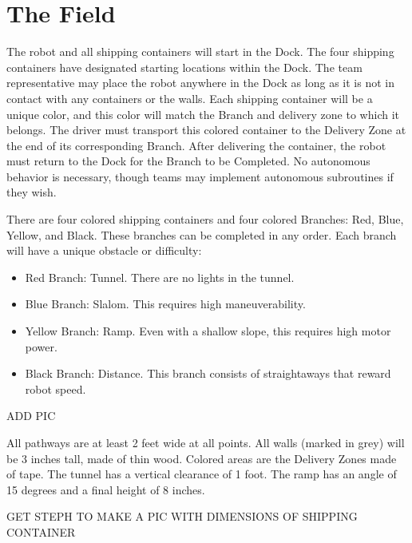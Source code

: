 \section{The Field}

The robot and all shipping containers will start in the Dock. The four shipping containers have designated starting locations within the Dock. The team representative may place the robot anywhere in the Dock as long as it is not in contact with any containers or the walls. Each shipping container will be a unique color, and this color will match the Branch and delivery zone to which it belongs. The driver must transport this colored container to the Delivery Zone at the end of its corresponding Branch. After delivering the container, the robot must return to the Dock for the Branch to be Completed. No autonomous behavior is necessary, though teams may implement autonomous subroutines if they wish. \newline 

\noindent
There are four colored shipping containers and four colored Branches: Red, Blue, Yellow, and Black. These branches can be completed in any order. Each branch will have a unique obstacle or difficulty:  

\begin{itemize}
    \item Red Branch: Tunnel. There are no lights in the tunnel. 
    \item Blue Branch: Slalom. This requires high maneuverability. 
    \item Yellow Branch: Ramp. Even with a shallow slope, this requires high motor power. 
    \item Black Branch: Distance. This branch consists of straightaways that reward robot speed. 
\end{itemize}

ADD PIC \newline

\noindent
All pathways are at least 2 feet wide at all points. All walls (marked in grey) will be 3 inches tall, made of thin wood. Colored areas are the Delivery Zones made of tape. The tunnel has a vertical clearance of 1 foot. The ramp has an angle of 15 degrees and a final height of 8 inches. \newline

\noindent
GET STEPH TO MAKE A PIC WITH DIMENSIONS OF SHIPPING CONTAINER
